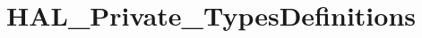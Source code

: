 \hypertarget{group___h_a_l___private___types_definitions}{}\section{H\+A\+L\+\_\+\+Private\+\_\+\+Types\+Definitions}
\label{group___h_a_l___private___types_definitions}
